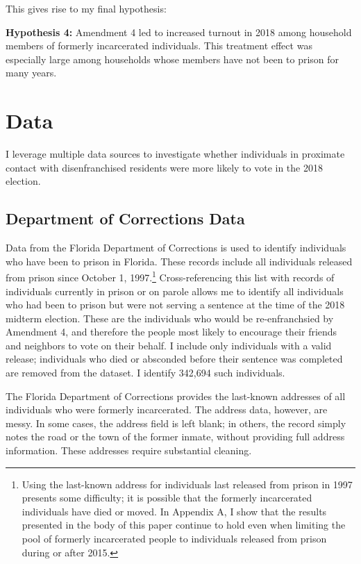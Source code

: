 \documentclass[
  12pt,
]{article}
\begin{document}
This gives rise to my final hypothesis:

\textbf{Hypothesis 4:} Amendment 4 led to increased turnout in 2018 among household members of formerly incarcerated individuals. This treatment effect was especially large among households whose members have not been to prison for many years.

\hypertarget{data}{%
\section*{Data}\label{data}}

I leverage multiple data sources to investigate whether individuals in proximate contact with disenfranchised residents were more likely to vote in the 2018 election.

\hypertarget{department-of-corrections-data}{%
\subsection*{Department of Corrections Data}\label{department-of-corrections-data}}

Data from the Florida Department of Corrections is used to identify individuals who have been to prison in Florida. These records include all individuals released from prison since October 1, 1997.\footnote{Using the last-known address for individuals last released from prison in 1997 presents some difficulty; it is possible that the formerly incarcerated individuals have died or moved. In Appendix A, I show that the results presented in the body of this paper continue to hold even when limiting the pool of formerly incarcerated people to individuals released from prison during or after 2015.} Cross-referencing this list with records of individuals currently in prison or on parole allows me to identify all individuals who had been to prison but were not serving a sentence at the time of the 2018 midterm election. These are the individuals who would be re-enfranchsied by Amendment 4, and therefore the people most likely to encourage their friends and neighbors to vote on their behalf. I include only individuals with a valid release; individuals who died or absconded before their sentence was completed are removed from the dataset. I identify 342,694 such individuals.

The Florida Department of Corrections provides the last-known addresses of all individuals who were formerly incarcerated. The address data, however, are messy. In some cases, the address field is left blank; in others, the record simply notes the road or the town of the former inmate, without providing full address information. These addresses require substantial cleaning.
\end{document}
